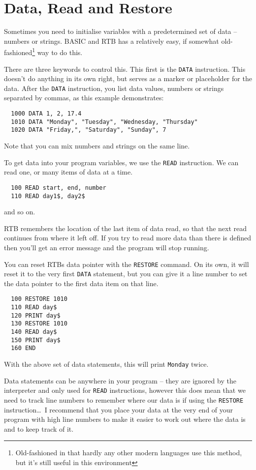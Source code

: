 \chapter{Data, Read and Restore}
Sometimes you need to initialise variables with a predetermined set
of data -- numbers or strings. BASIC and RTB has a relatively easy,
if somewhat old-fashioned\footnote{Old-fashioned in that hardly any
other modern languages use this method, but it's still useful in this
environment} way to do this.

There are three keywords to control this. This first is the {\tt DATA}
instruction. This doesn't do anything in its own right, but serves as a
marker or placeholder for the data. After the {\tt DATA} instruction,
you list data values, numbers or strings separated by commas, as this
example demonstrates:
\begin{verbatim}
  1000 DATA 1, 2, 17.4
  1010 DATA "Monday", "Tuesday", "Wednesday, "Thursday"
  1020 DATA "Friday,", "Saturday", "Sunday", 7
\end{verbatim}
Note that you can mix numbers and strings on the same line.

To get data into your program variables, we use the {\tt READ}
instruction. We can read one, or many items of data at a time.
\begin{verbatim}
  100 READ start, end, number
  110 READ day1$, day2$
\end{verbatim}
and so on.

RTB remembers the location of the last item of data read, so that the 
next read continues from where it left off. If you try to read more data
than there is defined then you'll get an error message and the program will
stop running.

You can reset RTBs data pointer with the {\tt RESTORE} command. On its own,
it will reset it to the very first {\tt DATA} statement, but you can give
it a line number to set the data pointer to the first data item on that
line.
\begin{verbatim}
  100 RESTORE 1010
  110 READ day$
  120 PRINT day$
  130 RESTORE 1010
  140 READ day$
  150 PRINT day$
  160 END
\end{verbatim}
With the above set of data statements, this will print {\tt Monday} twice.

Data \meek statements can be anywhere in your program -- they are ignored
by the interpreter and only used for {\tt READ} instructions, however
this does mean that we need to track line numbers to remember where
our data is if using the {\tt RESTORE} instruction\dots\ I recommend
that you place your data at the very end of your program with high line
numbers to make it easier to work out where the data is and to keep track
of it.


